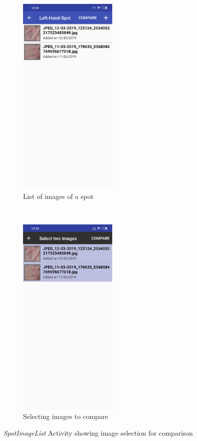 \begin{figure}[t!]
    \centering
    \begin{subfigure}[t]{0.5\textwidth}
        \centering
        \includegraphics[height=10cm]{figures/spothistory2_android.png}
        \caption{List of images of a spot}
        \label{subfig:spotimagelist}
    \end{subfigure}%
    ~
    \begin{subfigure}[t]{0.5\textwidth}
        \centering
        \includegraphics[height=10cm]{figures/compare1_android.png}
        \caption{Selecting images to compare}
        \label{subfig:spotimagelistcontext}
    \end{subfigure}
    \caption{\emph{SpotImageList} Activity showing image selection for comparison}
\end{figure}

